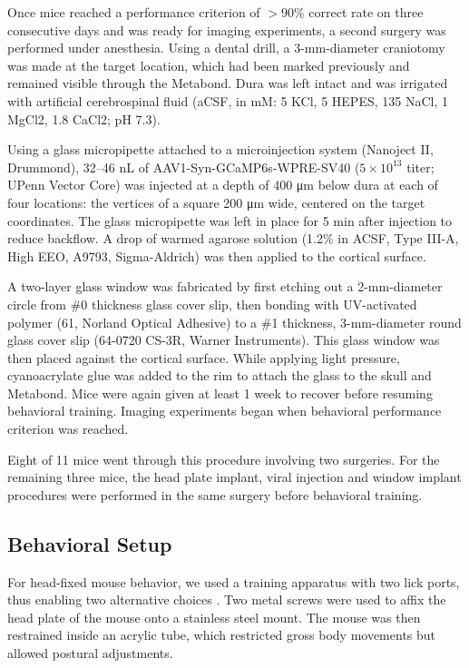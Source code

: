 Once mice reached a performance criterion of $>90\%$ correct rate on three consecutive days and was ready for imaging experiments, a second surgery was performed under anesthesia. Using a dental drill, a 3-mm-diameter craniotomy was made at the target location, which had been marked previously and remained visible through the Metabond. Dura was left intact and was irrigated with artificial cerebrospinal fluid (aCSF, in mM: 5 KCl, 5 HEPES, 135 NaCl, 1 MgCl2, 1.8 CaCl2; pH 7.3). 

Using a glass micropipette attached to a microinjection system (Nanoject II, Drummond), 32--46 nL of AAV1-Syn-GCaMP6s-WPRE-SV40 ($5 \times 10^{13}$ titer; UPenn Vector Core) was injected at a depth of 400 \unit{\micro\meter} below dura at each of four locations: the vertices of a square 200 \unit{\micro\meter} wide, centered on the target coordinates. The glass micropipette was left in place for 5 min after injection to reduce backflow. A drop of warmed agarose solution (1.2\% in ACSF, Type III-A, High EEO, A9793, Sigma-Aldrich) was then applied to the cortical surface. 

A two-layer glass window was fabricated by first etching out a 2-mm-diameter circle from \#0 thickness glass cover slip, then bonding with UV-activated polymer (61, Norland Optical Adhesive) to a \#1 thickness, 3-mm-diameter round glass cover slip (64-0720 CS-3R, Warner Instruments). This glass window was then placed against the cortical surface. While applying light pressure, cyanoacrylate glue was added to the rim to attach the glass to the skull and Metabond. Mice were again given at least 1 week to recover before resuming behavioral training. Imaging experiments began when behavioral performance criterion was reached. 

Eight of 11 mice went through this procedure involving two surgeries. For the remaining three mice, the head plate implant, viral injection and window implant procedures were performed in the same surgery before behavioral training.

\subsection*{Behavioral Setup}
For head-fixed mouse behavior, we used a training apparatus with two lick ports, thus enabling two alternative choices \citep{guo2014flow}. Two metal screws were used to affix the head plate of the mouse onto a stainless steel mount. The mouse was then restrained inside an acrylic tube, which restricted gross body movements but allowed postural adjustments. 

